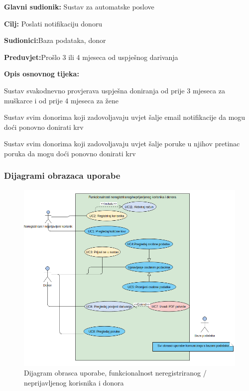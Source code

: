 \noindent {}
\begin{packed_item}
	
	\item \textbf{Glavni sudionik: }{Sustav za automatske poslove}
	\item  \textbf{Cilj:} {Poslati notifikaciju donoru}
	\item  \textbf{Sudionici:}{Baza podataka, donor}
	\item  \textbf{Preduvjet:}{Prošlo 3 ili 4 mjeseca od uspješnog darivanja}
	\item  \textbf{Opis osnovnog tijeka:}
	
	\item[] \begin{packed_enum}
		
		\item {Sustav svakodnevno provjerava uspješna doniranja od prije 3 mjeseca za muškarce i od prije 4 mjeseca za žene}
		\item {Sustav svim donorima koji zadovoljavaju uvjet šalje email notifikacije da mogu doći ponovno donirati krv}
		\item {Sustav svim donorima koji zadovoljavaju uvjet šalje poruke u njihov pretinac poruka da mogu doći ponovno donirati krv}
		
	\end{packed_enum}
	
\end{packed_item}


\subsubsection{Dijagrami obrazaca uporabe}
\begin{figure}[H]
			\includegraphics[scale=0.6]{dijagrami/Funkcionalnosti_korisnika_donora.png} %
			\centering
			\caption{Dijagram obrasca uporabe, funkcionalnost neregistriranog / neprijavljenog korisnika i donora}
			\label{fig:Funkcionalnosti_korisnika_donora}
\end{figure}


